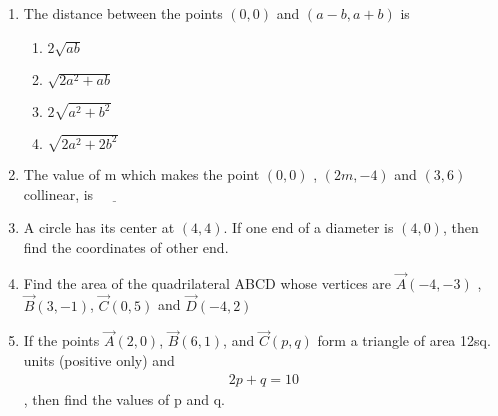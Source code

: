 \begin{enumerate}
\item The distance between the points $(0,0)$ and $(a-b, a+b)$ is 
\begin{enumerate}
\item $2{\sqrt{ab}}$
\item $\sqrt{2a^2 + ab}$
\item $ 2\sqrt{a^2 + b^2}$
\item $ \sqrt{2a^2 + 2b^2}$
\end{enumerate}
\item The value of m which makes the point $(0,0)$ , $(2m, -4)$ and $(3,6)$ collinear, is $\underline{\hspace{1cm}}$
\item A circle has its center at $(4,4)$. If one end of a diameter is $(4,0)$, then find the coordinates of other end.
\item  Find the area of the quadrilateral ABCD whose vertices are $\vec A(-4, -3)$ , $\vec B(3, -1)$, $\vec C(0, 5)$ and $\vec D(-4, 2)$
\item If the points $\vec{A}(2,0)$, $\vec{B}(6,1)$, and $\vec{C}(p ,q)$ form a triangle of area 12sq. units (positive only) and \begin{align}2p + q = 10\end{align}, then find the values of p and q.
\end{enumerate}

